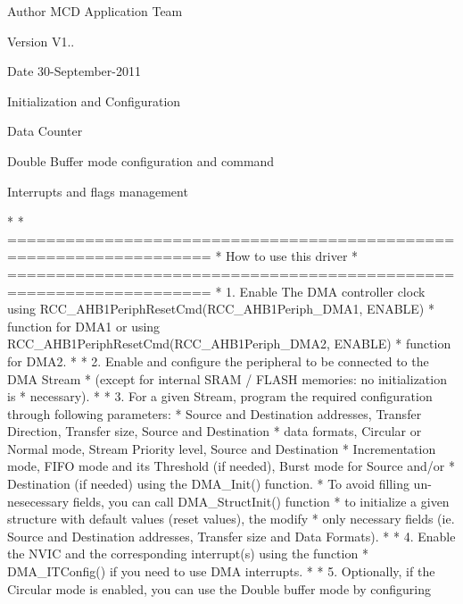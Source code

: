 \begin{DoxyAuthor}{Author}
M\+CD Application Team 
\end{DoxyAuthor}
\begin{DoxyVersion}{Version}
V1.. 
\end{DoxyVersion}
\begin{DoxyDate}{Date}
30-\/\+September-\/2011
\begin{DoxyItemize}
\item Initialization and Configuration
\item Data Counter
\item Double Buffer mode configuration and command
\item Interrupts and flags management
\end{DoxyItemize}
\end{DoxyDate}
\begin{DoxyVerb}*      
*          ===================================================================      
*                                 How to use this driver
*          =================================================================== 
*          1. Enable The DMA controller clock using RCC_AHB1PeriphResetCmd(RCC_AHB1Periph_DMA1, ENABLE)
*             function for DMA1 or using RCC_AHB1PeriphResetCmd(RCC_AHB1Periph_DMA2, ENABLE)
*             function for DMA2.
*
*          2. Enable and configure the peripheral to be connected to the DMA Stream
*             (except for internal SRAM / FLASH memories: no initialization is 
*             necessary). 
*        
*          3. For a given Stream, program the required configuration through following parameters:   
*             Source and Destination addresses, Transfer Direction, Transfer size, Source and Destination 
*             data formats, Circular or Normal mode, Stream Priority level, Source and Destination 
*             Incrementation mode, FIFO mode and its Threshold (if needed), Burst mode for Source and/or 
*             Destination (if needed) using the DMA_Init() function.
*             To avoid filling un-nesecessary fields, you can call DMA_StructInit() function
*             to initialize a given structure with default values (reset values), the modify
*             only necessary fields (ie. Source and Destination addresses, Transfer size and Data Formats).
*
*          4. Enable the NVIC and the corresponding interrupt(s) using the function 
*             DMA_ITConfig() if you need to use DMA interrupts. 
*
*          5. Optionally, if the Circular mode is enabled, you can use the Double buffer mode by configuring 

\end{DoxyVerb}
